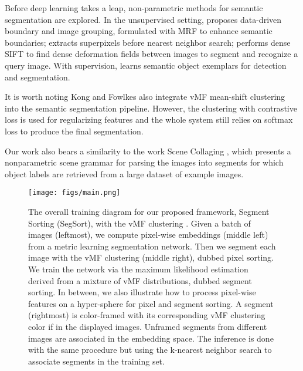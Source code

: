 \documentclass[10pt,twocolumn,letterpaper]{article}
\begin{document}
Before deep learning takes a leap, non-parametric methods for semantic segmentation are explored. In the unsupervised setting,  \cite{russell2009segmenting} proposes data-driven boundary and image grouping,  formulated with MRF to enhance semantic boundaries; \cite{tighe2010superparsing} extracts superpixels before nearest neighbor search;  \cite{liu2011nonparametric} performs dense SIFT to find dense deformation fields between images to segment and recognize a query image. With supervision, \cite{malisiewicz2008recognition} learns semantic object exemplars for detection and segmentation.

It is worth noting Kong and Fowlkes \cite{kong2018recurrent} also integrate vMF mean-shift clustering into the semantic segmentation pipeline. However, the clustering with contrastive loss is used for regularizing features and the whole system still relies on softmax loss to produce the final segmentation.

Our work also bears a similarity to the work Scene Collaging \cite{isola2013scene}, which presents a nonparametric scene grammar for parsing the images into segments for which object labels are retrieved from a large dataset of example images. 



\begin{figure*}[t]
    \centering
    \texttt{[image: figs/main.png]}
    \caption{The overall training diagram for our proposed framework, Segment Sorting (SegSort), with the vMF clustering \cite{banerjee2005clustering}. Given a batch of images (leftmost), we compute pixel-wise embeddings (middle left) from a metric learning segmentation network. Then we segment each image with the vMF clustering (middle right), dubbed pixel sorting. We train the network via the maximum likelihood estimation derived from a mixture of vMF distributions, dubbed segment sorting. In between, we also illustrate how to process pixel-wise features on a hyper-sphere for pixel and segment sorting. A segment (rightmost) is color-framed with its corresponding vMF clustering color if in the displayed images. Unframed segments from different images are associated in the embedding space. The inference is done with the same procedure but using the k-nearest neighbor search to associate segments in the training set.}
    \label{fig:main}
\end{figure*}
\end{document}
